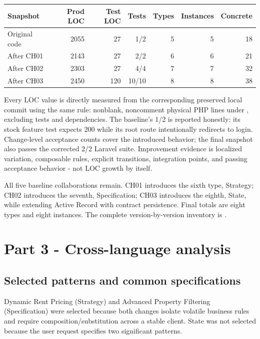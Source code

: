 \documentclass[11pt,a4paper]{article}
\newcommand{\codepath}[1]{\path{#1}}
\begin{document}
\begin{longtable}{p{}rrrrrr}
\toprule
\rowcolor{B4Blue}\color{white}\textbf{Snapshot} & \color{white}\textbf{Prod LOC} & \color{white}\textbf{Test LOC} & \color{white}\textbf{Tests} & \color{white}\textbf{Types} & \color{white}\textbf{Instances} & \color{white}\textbf{Concrete}\\
\midrule
Original code & 2055 & 27 & 1/2 & 5 & 5 & 18\\
After CH01 & 2143 & 27 & 2/2 & 6 & 6 & 21\\
After CH02 & 2303 & 27 & 4/4 & 7 & 7 & 32\\
After CH03 & 2450 & 120 & 10/10 & 8 & 8 & 38\\
\bottomrule
\end{longtable}

Every LOC value is directly measured from the corresponding preserved local commit using the same rule: nonblank, noncomment physical PHP lines under \codepath{app/}, excluding tests and dependencies. The baseline's 1/2 is reported honestly: its stock feature test expects 200 while its root route intentionally redirects to login. Change-level acceptance counts cover the introduced behavior; the final snapshot also passes the corrected 2/2 Laravel suite. Improvement evidence is localized variation, composable rules, explicit transitions, integration points, and passing acceptance behavior - not LOC growth by itself.

All five baseline collaborations remain. CH01 introduces the sixth type, Strategy; CH02 introduces the seventh, Specification; CH03 introduces the eighth, State, while extending Active Record with contract persistence. Final totals are eight types and eight instances. The complete version-by-version inventory is \codepath{data/patterns_evolution.csv}.

\section{Part 3 - Cross-language analysis}

\subsection{Selected patterns and common specifications}

Dynamic Rent Pricing (Strategy) and Advanced Property Filtering (Specification) were selected because both changes isolate volatile business rules and require composition/substitution across a stable client. State was not selected because the user request specifies two significant patterns.
\end{document}
